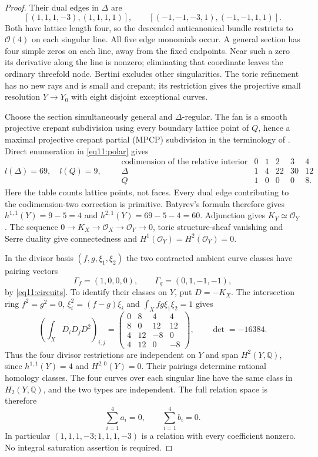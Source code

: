 \documentclass[11pt]{amsart}
\theoremstyle{definition}
\theoremstyle{remark}
\newcommand{\cO}{\mathcal O}
\begin{document}
\begin{proof}
Their dual edges in $\Delta$ are
\[
 [(1,1,1,-3),(1,1,1,1)],\qquad
 [(-1,-1,-3,1),(-1,-1,1,1)].
\]
Both have lattice length four, so the descended anticanonical bundle
restricts to $\cO(4)$ on each singular line. All five edge monomials
occur. A general section has four simple zeros on each line, away
from the fixed endpoints. Near such a zero its derivative along the
line is nonzero; eliminating that coordinate leaves the ordinary
threefold node. Bertini excludes other singularities. The toric
refinement has no new rays and is small and crepant; its restriction
gives the projective small resolution $Y\to Y_0$ with eight disjoint
exceptional curves.

Choose the section simultaneously general and $\Delta$-regular.
The fan is a smooth projective crepant subdivision using every boundary
lattice point of $Q$, hence a maximal projective crepant partial
(MPCP) subdivision in the terminology
of \cite{batyrev1994}. Direct enumeration in \eqref{eq11:polar} gives
\[
 l(\Delta)=69,\quad l(Q)=9,\qquad
 \begin{array}{c|rrrrr}
 \text{codimension of the relative interior}&0&1&2&3&4\\\hline
 \Delta&1&4&22&30&12\\
 Q&1&0&0&0&8.
 \end{array}
\]
Here the table counts lattice points, not faces. Every dual edge
contributing to the codimension-two correction is primitive.
Batyrev's formula \cite[Corollary~4.5.1]{batyrev1994} therefore gives
$h^{1,1}(Y)=9-5=4$ and $h^{2,1}(Y)=69-5-4=60$.
Adjunction gives $K_Y\simeq\cO_Y$. The sequence
$0\to K_X\to\cO_X\to\cO_Y\to0$, toric structure-sheaf vanishing
and Serre duality give connectedness and
$H^1(\cO_Y)=H^2(\cO_Y)=0$.

In the divisor basis $(f,g,\xi_1,\xi_2)$ the two contracted ambient
curve classes have pairing vectors
\[
 \Gamma_f=(1,0,0,0),\qquad \Gamma_g=(0,1,-1,-1),
\]
by \eqref{eq11:circuits}. To identify their classes on $Y$, put
$D=-K_X$. The intersection ring
$f^2=g^2=0$, $\xi_i^2=(f-g)\xi_i$ and
$\int_Xfg\xi_1\xi_2=1$ gives
\begin{equation}\label{eq11:gram}
 \left(\int_X D_iD_jD^2\right)_{i,j}
 =\begin{pmatrix}
 0&8&4&4\\8&0&12&12\\4&12&-8&0\\4&12&0&-8
 \end{pmatrix},\qquad \det=-16384.
\end{equation}
Thus the four divisor restrictions are independent on $Y$ and span
$H^2(Y,\mathbb Q)$, since $h^{1,1}(Y)=4$ and $H^{2,0}(Y)=0$.
Their pairings determine rational homology classes. The four curves
over each singular line have the same class in $H_2(Y,\mathbb Q)$,
and the two types are independent. The full relation space is therefore
\begin{equation}\label{eq11:relations}
 \sum_{i=1}^4a_i=0,\qquad \sum_{i=1}^4b_i=0.
\end{equation}
In particular $(1,1,1,-3;1,1,1,-3)$ is a relation with every
coefficient nonzero. No integral saturation assertion is required.


\end{proof}
\end{document}
